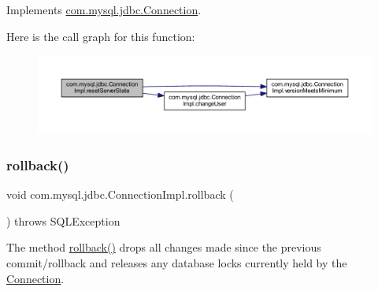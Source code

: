 Implements \mbox{\hyperlink{interfacecom_1_1mysql_1_1jdbc_1_1_connection_ac618ee80c02d7672e277b3be75304f6e}{com.\+mysql.\+jdbc.\+Connection}}.

Here is the call graph for this function\+:\nopagebreak
\begin{figure}[H]
\begin{center}
\leavevmode
\includegraphics[width=350pt]{classcom_1_1mysql_1_1jdbc_1_1_connection_impl_a1335fc09ccb7954de9bffc4b59a489aa_cgraph}
\end{center}
\end{figure}
\mbox{\label{classcom_1_1mysql_1_1jdbc_1_1_connection_impl_a62b6461dc72ef3c739da196995cb9786}} 
\subsubsection{\texorpdfstring{rollback()}{rollback()}\hspace{0.1cm}{\footnotesize\ttfamily [1/2]}}
{\footnotesize\ttfamily void com.\+mysql.\+jdbc.\+Connection\+Impl.\+rollback (\begin{DoxyParamCaption}{ }\end{DoxyParamCaption}) throws S\+Q\+L\+Exception}

The method \mbox{\hyperlink{classcom_1_1mysql_1_1jdbc_1_1_connection_impl_a62b6461dc72ef3c739da196995cb9786}{rollback()}} drops all changes made since the previous commit/rollback and releases any database locks currently held by the \mbox{\hyperlink{interfacecom_1_1mysql_1_1jdbc_1_1_connection}{Connection}}.


